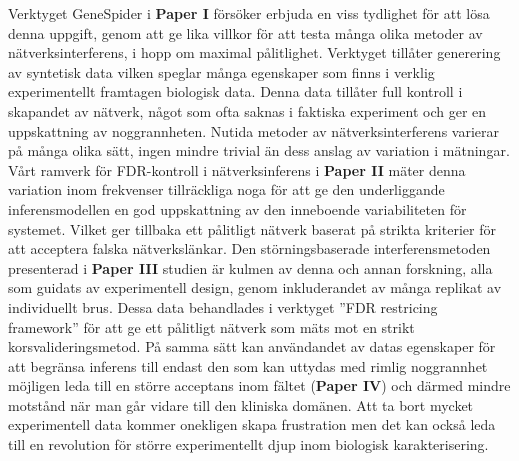 Verktyget GeneSpider i \textbf{Paper I} försöker erbjuda en viss tydlighet för att lösa denna uppgift, genom att ge lika villkor för att testa många olika metoder av nätverksinterferens, i hopp om maximal pålitlighet. Verktyget tillåter generering av syntetisk data vilken speglar många egenskaper som finns i verklig experimentellt framtagen biologisk data. Denna data tillåter full kontroll i skapandet av nätverk, något som ofta saknas i faktiska experiment och ger en uppskattning av noggrannheten. Nutida metoder av nätverksinterferens varierar på många olika sätt, ingen mindre trivial än dess anslag av variation i mätningar. Vårt ramverk för FDR-kontroll i nätverksinferens i \textbf{Paper II} mäter denna variation inom frekvenser tillräckliga noga för att ge den underliggande inferensmodellen en god uppskattning av den inneboende variabiliteten för systemet. Vilket ger tillbaka ett pålitligt nätverk baserat på strikta kriterier för att acceptera falska nätverkslänkar. Den störningsbaserade interferensmetoden presenterad i \textbf{Paper III} studien är kulmen av denna och annan forskning, alla som guidats av experimentell design, genom inkluderandet av många replikat av individuellt brus. Dessa data behandlades i verktyget ”FDR restricing framework” för att ge ett pålitligt nätverk som mäts mot en strikt korsvalideringsmetod. På samma sätt kan användandet av datas egenskaper för att begränsa inferens till endast den som kan uttydas med rimlig noggrannhet möjligen leda till en större acceptans inom fältet (\textbf{Paper IV}) och därmed mindre motstånd när man går vidare till den kliniska domänen. Att ta bort mycket experimentell data kommer onekligen skapa frustration men det kan också leda till en revolution för större experimentellt djup inom biologisk karakterisering.
 \\







